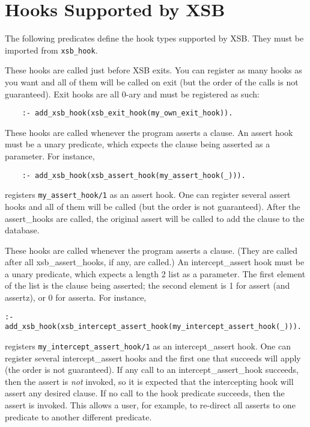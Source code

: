 \section{Hooks Supported by XSB}

The following predicates define the hook types supported by XSB. They must
be imported from {\tt xsb\_hook}.

\begin{description}

These hooks are called just before XSB exits. You can register as many
hooks as you want and all of them will be called on exit (but the order of
the calls is not guaranteed). Exit hooks are all 0-ary and must be registered
as such:
\begin{verbatim}
    :- add_xsb_hook(xsb_exit_hook(my_own_exit_hook)).
\end{verbatim}


%
These hooks are called whenever the program asserts a clause. An assert
hook must be a unary predicate, which expects the clause
being asserted as a parameter. For instance,
\begin{verbatim}
    :- add_xsb_hook(xsb_assert_hook(my_assert_hook(_))).
\end{verbatim}
registers {\tt my\_assert\_hook/1} as an assert hook. One can register
several assert hooks and all of them will be called (but the order is
not guaranteed).  After the assert\_hooks are called, the original
assert will be called to add the clause to the database.

%
These hooks are called whenever the program asserts a clause.  (They
are called after all xsb\_assert\_hooks, if any, are called.)  An
intercept\_assert hook must be a unary predicate, which expects a
length 2 list as a parameter.  The first element of the list is the
clause being asserted; the second element is 1 for assert (and
assertz), or 0 for asserta.  For instance,
\begin{verbatim}
:- add_xsb_hook(xsb_intercept_assert_hook(my_intercept_assert_hook(_))).
\end{verbatim}
registers {\tt my\_intercept\_assert\_hook/1} as an intercept\_assert
hook. One can register several intercept\_assert hooks and the first
one that succeeds will apply (the order is not guaranteed).  If any
call to an intercept\_assert\_hook succeeds, then the assert is {\em not}
invoked, so it is expected that the intercepting hook will assert any
desired clause.  If no call to the hook predicate succeeds, then the
assert is invoked.  This allows a user, for example, to re-direct all
asserts to one predicate to another different predicate.


\end{description}
